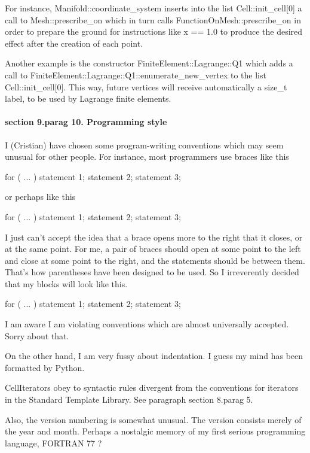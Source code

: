 {For instance, {\codett Manifold::coordinate\_system} inserts into the list
{\codett Cell::init\_cell[0]} a call to {\codett Mesh::prescribe\_on} which in turn calls
{\codett FunctionOnMesh::prescribe\_on} in order to prepare the ground for instructions like
{\codett x == 1.0} to produce the desired effect after the creation of each point.

Another example is the constructor {\codett FiniteElement::Lagrange::Q1}
which adds a call to {\codett FiniteElement::Lagrange::Q1::enumerate\_new\_vertex} to
the list {\codett Cell::init\_cell[0]}.
This way, future vertices will receive automatically a {\codett size\_t} label, to be used
by Lagrange finite elements.


\paragraph{\numb section 9.\numb parag 10. Programming style}

I (Cristian) have chosen some program-writing conventions which may seem unusual for other people.
For instance, most programmers use braces like this

\verbatim
   for ( ... ) {
      statement 1;
      statement 2;
      statement 3;
   }
\endverbatim

or perhaps like this

\verbatim
   for ( ... )
   {
      statement 1;
      statement 2;
      statement 3;
   }
\endverbatim

I just can't accept the idea that a brace opens more to the right that it closes, or at the
same point.
For me, a pair of braces should open at some point to the left and close at some point to the
right, and the statements should be between them.
That's how parentheses have been designed to be used.
So I irreverently decided that my blocks will look like this.

\verbatim
   for ( ... )
   {  statement 1;
      statement 2;
      statement 3;  }
\endverbatim

I am aware I am violating conventions which are almost universally accepted. Sorry about that.

On the other hand, I am very fussy about indentation.
I guess my mind has been formatted by Python.

{\codett CellIterator}s obey to syntactic rules divergent from the conventions for iterators
in the Standard Template Library.
See paragraph \numb section 8.\numb parag 5.

Also, the version numbering is somewhat unusual.
The version consists merely of the year and month.
Perhaps a nostalgic memory of my first serious programming language, FORTRAN 77 ?


}
